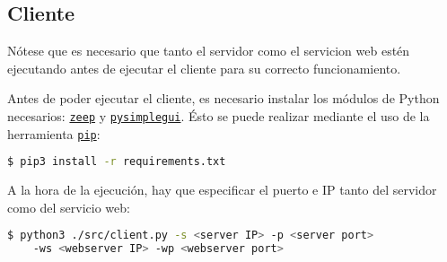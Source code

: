 \subsection{Cliente}

Nótese que es necesario que tanto el servidor como el servicion web estén ejecutando antes de ejecutar el cliente para su correcto funcionamiento.\newline

Antes de poder ejecutar el cliente, es necesario instalar los módulos de Python necesarios: \href{https://pypi.org/project/zeep/}{\texttt{zeep}} y \href{https://pypi.org/project/pysimplegui/}{\texttt{pysimplegui}}. Ésto se puede realizar mediante el uso de la herramienta \href{https://pypi.org/project/pip/}{\texttt{pip}}:

\begin{lstlisting}[language=bash]
    $ pip3 install -r requirements.txt
\end{lstlisting}

A la hora de la ejecución, hay que especificar el puerto e IP tanto del servidor como del servicio web:
\begin{lstlisting}[language=bash]
    $ python3 ./src/client.py -s <server IP> -p <server port>
    -ws <webserver IP> -wp <webserver port>
\end{lstlisting}
